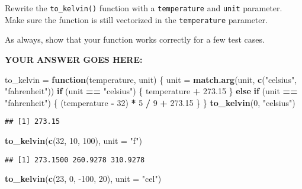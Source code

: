 \documentclass[
]{article}
\newenvironment{Shaded}{\begin{snugshade}}{\end{snugshade}}
\newcommand{\ControlFlowTok}[1]{\textcolor[rgb]{0.13,0.29,0.53}{\textbf{#1}}}
\newcommand{\DataTypeTok}[1]{\textcolor[rgb]{0.13,0.29,0.53}{#1}}
\newcommand{\DecValTok}[1]{\textcolor[rgb]{0.00,0.00,0.81}{#1}}
\newcommand{\FloatTok}[1]{\textcolor[rgb]{0.00,0.00,0.81}{#1}}
\newcommand{\KeywordTok}[1]{\textcolor[rgb]{0.13,0.29,0.53}{\textbf{#1}}}
\newcommand{\NormalTok}[1]{#1}
\newcommand{\OperatorTok}[1]{\textcolor[rgb]{0.81,0.36,0.00}{\textbf{#1}}}
\newcommand{\StringTok}[1]{\textcolor[rgb]{0.31,0.60,0.02}{#1}}
\begin{document}
Rewrite the \texttt{to\_kelvin()} function with a \texttt{temperature}
and \texttt{unit} parameter. Make sure the function is still vectorized
in the \texttt{temperature} parameter.

As always, show that your function works correctly for a few test cases.

\textbf{YOUR ANSWER GOES HERE:}

\begin{Shaded}
\begin{Highlighting}[]
\NormalTok{to\_kelvin =}\StringTok{ }\ControlFlowTok{function}\NormalTok{(temperature, unit) \{}
\NormalTok{    unit =}\StringTok{ }\KeywordTok{match.arg}\NormalTok{(unit, }\KeywordTok{c}\NormalTok{(}\StringTok{"celsius"}\NormalTok{, }\StringTok{"fahrenheit"}\NormalTok{))}
    \ControlFlowTok{if}\NormalTok{ (unit }\OperatorTok{==}\StringTok{ "celsius"}\NormalTok{) \{}
\NormalTok{        temperature }\OperatorTok{+}\StringTok{ }\FloatTok{273.15}
\NormalTok{    \} }\ControlFlowTok{else} \ControlFlowTok{if}\NormalTok{ (unit }\OperatorTok{==}\StringTok{ "fahrenheit"}\NormalTok{) \{}
\NormalTok{        (temperature }\OperatorTok{{-}}\StringTok{ }\DecValTok{32}\NormalTok{) }\OperatorTok{*}\StringTok{ }\DecValTok{5} \OperatorTok{/}\StringTok{ }\DecValTok{9} \OperatorTok{+}\StringTok{ }\FloatTok{273.15}
\NormalTok{    \}}
\NormalTok{\}}
\KeywordTok{to\_kelvin}\NormalTok{(}\DecValTok{0}\NormalTok{, }\StringTok{"celsius"}\NormalTok{)}
\end{Highlighting}
\end{Shaded}

\begin{verbatim}
## [1] 273.15
\end{verbatim}

\begin{Shaded}
\begin{Highlighting}[]
\KeywordTok{to\_kelvin}\NormalTok{(}\KeywordTok{c}\NormalTok{(}\DecValTok{32}\NormalTok{, }\DecValTok{10}\NormalTok{, }\DecValTok{100}\NormalTok{), }\DataTypeTok{unit =} \StringTok{"f"}\NormalTok{)}
\end{Highlighting}
\end{Shaded}

\begin{verbatim}
## [1] 273.1500 260.9278 310.9278
\end{verbatim}

\begin{Shaded}
\begin{Highlighting}[]
\KeywordTok{to\_kelvin}\NormalTok{(}\KeywordTok{c}\NormalTok{(}\DecValTok{23}\NormalTok{, }\DecValTok{0}\NormalTok{, }\DecValTok{{-}100}\NormalTok{, }\DecValTok{20}\NormalTok{), }\DataTypeTok{unit =} \StringTok{"cel"}\NormalTok{)}
\end{Highlighting}
\end{Shaded}
\end{document}
